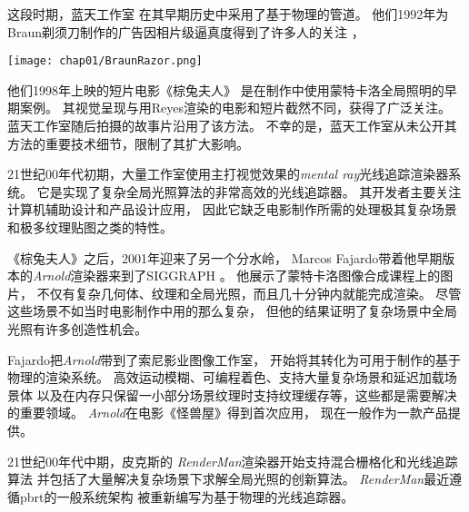 这段时期，蓝天工作室
在其早期历史中采用了基于物理的管道\citep{ohmer1997}。
他们1992年为Braun剃须刀制作的广告因相片级逼真度得到了许多人的关注
，
\begin{marginfigure}
    \texttt{[image: chap01/BraunRazor.png]}
\end{marginfigure}
他们1998年上映的短片电影《棕兔夫人》
是在制作中使用蒙特卡洛全局照明的早期案例。
其视觉呈现与用Reyes渲染的电影和短片截然不同，获得了广泛关注。
蓝天工作室随后拍摄的故事片沿用了该方法。
不幸的是，蓝天工作室从未公开其方法的重要技术细节，限制了其扩大影响。

21世纪00年代初期，大量工作室使用主打视觉效果的\emph{mental ray}光线追踪渲染器系统。
它是实现了复杂全局光照算法的非常高效的光线追踪器。
其开发者主要关注计算机辅助设计和产品设计应用，
因此它缺乏电影制作所需的处理极其复杂场景和极多纹理贴图之类的特性。

《棕兔夫人》之后，2001年迎来了另一个分水岭，
Marcos Fajardo带着他早期版本的\emph{Arnold}渲染器来到了SIGGRAPH
。
他展示了蒙特卡洛图像合成课程上的图片，
不仅有复杂几何体、纹理和全局光照，而且几十分钟内就能完成渲染。
尽管这些场景不如当时电影制作中用的那么复杂，
但他的结果证明了复杂场景中全局光照有许多创造性机会。

Fajardo把\emph{Arnold}带到了索尼影业图像工作室，
开始将其转化为可用于制作的基于物理的渲染系统。
高效运动模糊、可编程着色、支持大量复杂场景和延迟加载场景体
以及在内存只保留一小部分场景纹理时支持纹理缓存等，这些都是需要解决的重要领域。
\emph{Arnold}在电影《怪兽屋》得到首次应用，
现在一般作为一款产品提供。

21世纪00年代中期，皮克斯的
\emph{RenderMan}渲染器开始支持混合栅格化和光线追踪算法
并包括了大量解决复杂场景下求解全局光照的创新算法。
\emph{RenderMan}最近遵循pbrt的一般系统架构\citep{10.1145/2776880.2792699}
被重新编写为基于物理的光线追踪器。

